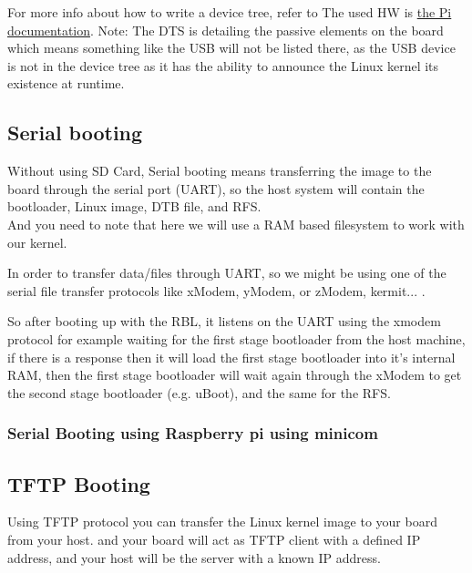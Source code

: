 \documentclass{article}
\begin{document}


For more info about how to write a device tree, refer to The used HW is \href{https://www.raspberrypi.org/documentation/configuration/device-tree.md}{the Pi documentation}.
Note: The DTS is detailing the passive elements on the board which means something like the USB will not be listed there, as the USB device is not in the device tree as it has the ability to announce the Linux kernel its existence at runtime.

\subsection{Serial booting}
Without using SD Card, Serial booting means transferring the image to the board through the serial port (UART), so the host system will contain the bootloader, Linux image, DTB file, and RFS.\\

And you need to note that here we will use a RAM based filesystem to work with our kernel.\

\begin{mybox}[title={Note: Serial file transfer protocols}]
    In order to transfer data/files through UART, so we might be using one of the serial file transfer protocols like xModem, yModem, or zModem, kermit... .
\end{mybox}

So after booting up with the RBL, it listens on the UART using the xmodem protocol for example waiting for the first stage bootloader from the host machine, if there is a response then it will load the first stage bootloader into it's internal RAM, then the first stage bootloader will wait again through the xModem to get the second stage bootloader (e.g. uBoot), and the same for the RFS.

\subsubsection{Serial Booting using Raspberry pi using minicom}

\subsection{TFTP Booting}
Using TFTP protocol you can transfer the Linux kernel image to your board from your host. and your board will act as TFTP client with a defined IP address, and your host will be the server with a known IP address.
\end{document}

